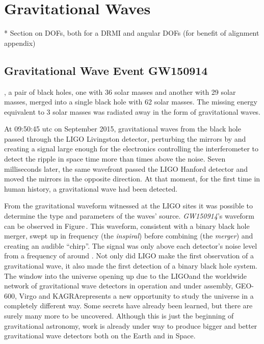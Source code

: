 \chapter{Gravitational Waves}
\label{c:gw-detection}

* Section on DOFs, both for a DRMI and angular DOFs (for benefit of alignment appendix)

\section{Gravitational Wave Event GW150914}
, a pair of black holes, one with 36 solar masses and another with 29 solar masses, merged into a single black hole with 62 solar masses. The missing energy equivalent to 3 solar masses was radiated away in the form of gravitational waves.

At 09:50:45 \gls{utc} on  September 2015, gravitational waves from the black hole passed through the LIGO Livingston detector, perturbing the mirrors by  and creating a signal large enough for the electronics controlling the interferometer to detect the ripple in space time more than  times above the noise. Seven milliseconds later, the same wavefront passed the LIGO Hanford detector and moved the mirrors in the opposite direction. At that moment, for the first time in human history, a gravitational wave had been detected.

From the gravitational waveform witnessed at the LIGO sites it was possible to determine the type and parameters of the waves' source. \emph{GW150914}'s waveform can be observed in Figure\,. This waveform, consistent with a binary black hole merger, swept up in frequency (the \emph{inspiral}) before combining (the \emph{merger}) and creating an audible ``chirp''. The signal was only above each detector's noise level from a frequency of around . Not only did LIGO make the first observation of a gravitational wave, it also made the first detection of a binary black hole system. The window into the universe opening up due to the LIGO\textemdash and the worldwide network of gravitational wave detectors in operation and under assembly, GEO-600, Virgo and KAGRA\textemdash represents a new opportunity to study the universe in a completely different way. Some secrets have already been learned, but there are surely many more to be uncovered. Although this is just the beginning of gravitational astronomy, work is already under way to produce bigger and better gravitational wave detectors both on the Earth and in Space.

